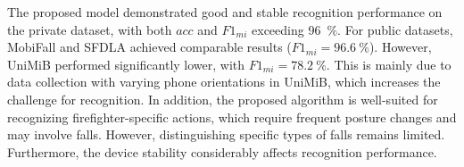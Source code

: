 \documentclass[journal,twoside,web]{ieeecolor}
\begin{document}
The proposed model demonstrated good and stable recognition performance on the private dataset, with both $acc$ and $F1_{mi}$ exceeding 96~\%. For public datasets, MobiFall and SFDLA achieved comparable results ($F1_{mi}=96.6~\%$). However, UniMiB performed significantly lower, with $F1_{mi}=78.2~\%$. This is mainly due to data collection with varying phone orientations in UniMiB, which increases the challenge for recognition. In addition, the proposed algorithm is well-suited for recognizing firefighter-specific actions, which require frequent posture changes and may involve falls. However, distinguishing specific types of falls remains limited. Furthermore, the device stability considerably affects recognition performance.


\begin{table}[h!]
\centering
\caption{Comparison of the proposed fall detection model with previous other model for firefighter.}
\label{tab:fall_detection_model}
\footnotesize
\renewcommand{\arraystretch}{1.2} %
\end{table}
\end{document}
